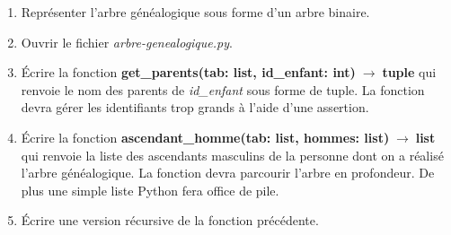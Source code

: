 \documentclass[a4paper,11pt]{article}
\begin{document}
\begin{Form}
\begin{exo}
\begin{center}
\label{manu}
\end{center}
\begin{enumerate}[resume]
\item Représenter l'arbre généalogique sous forme d'un arbre binaire.
\item Ouvrir le fichier \emph{arbre-genealogique.py}.
\item Écrire la fonction \textbf{get\_parents(tab: list, id\_enfant: int)$\;\rightarrow\;$tuple} qui renvoie le nom des parents de \emph{id\_enfant} sous forme de tuple. La fonction devra gérer les identifiants trop grands à l'aide d'une assertion.
\item Écrire la fonction \textbf{ascendant\_homme(tab: list, hommes: list)$\;\rightarrow\;$list} qui renvoie la liste des ascendants masculins de la personne dont on a réalisé l'arbre généalogique. La fonction devra parcourir l'arbre en profondeur. De plus une simple liste Python fera office de pile.
\item Écrire une version récursive de la fonction précédente.
\end{enumerate}
\end{exo}
\begin{exo}
\begin{center}
\end{center}
\end{exo}
\end{Form}
\end{document}
